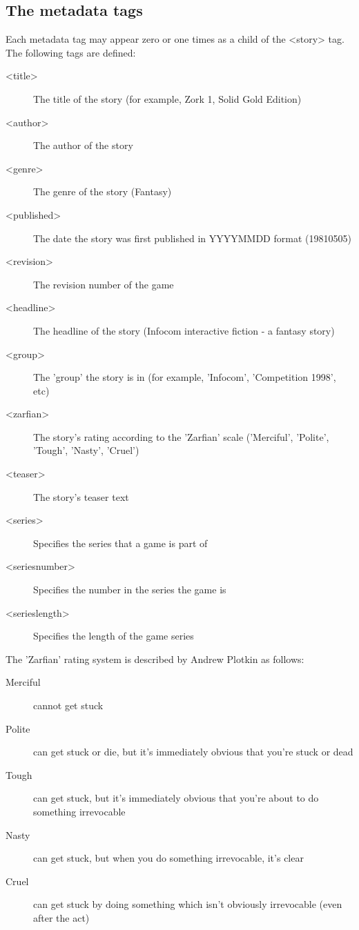 \documentclass[a4paper,11pt]{article}
\begin{document}
\subsection{The metadata tags}

Each metadata tag may appear zero or one times as a child of  the <story> tag. The following
tags are defined:

\begin{description}
\item[<title>] The title of the story (for example, Zork 1, Solid Gold Edition)
\item[<author>] The author of the story
\item[<genre>] The genre of the story (Fantasy)
\item[<published>] The date the story was first published in YYYYMMDD format (19810505)
\\
\item[<revision>] The revision number of the game
\item[<headline>] The headline of the story (Infocom interactive fiction - a fantasy story)
\item[<group>] The 'group' the story is in (for example, 'Infocom', 'Competition 1998', etc)
\item[<zarfian>] The story's rating according to the 'Zarfian' scale ('Merciful', 'Polite', 
'Tough', 'Nasty', 'Cruel')
\item[<teaser>] The story's teaser text
\item[<series>] Specifies the series that a game is part of
\item[<seriesnumber>] Specifies the number in the series the game is
\item[<serieslength>] Specifies the length of the game series
\end{description}

The 'Zarfian' rating system is described by Andrew Plotkin as follows:

\begin{description}
\item[Merciful] cannot get stuck
\item[Polite] can get stuck or die, but it's immediately obvious that you're stuck or dead
\item[Tough] can get stuck, but it's immediately obvious that you're about to do something 
irrevocable
\item[Nasty] can get stuck, but when you do something irrevocable, it's clear 
\item[Cruel] can get stuck by doing something which isn't obviously irrevocable (even after the act)
\end{description}
\end{document}
